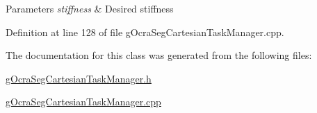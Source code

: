 \begin{DoxyParams}{Parameters}
{\em stiffness} & Desired stiffness \\
\hline
\end{DoxyParams}


Definition at line 128 of file g\+Ocra\+Seg\+Cartesian\+Task\+Manager.\+cpp.



The documentation for this class was generated from the following files\+:\begin{DoxyCompactItemize}
\item 
\hyperlink{gOcraSegCartesianTaskManager_8h}{g\+Ocra\+Seg\+Cartesian\+Task\+Manager.\+h}\item 
\hyperlink{gOcraSegCartesianTaskManager_8cpp}{g\+Ocra\+Seg\+Cartesian\+Task\+Manager.\+cpp}\end{DoxyCompactItemize}
